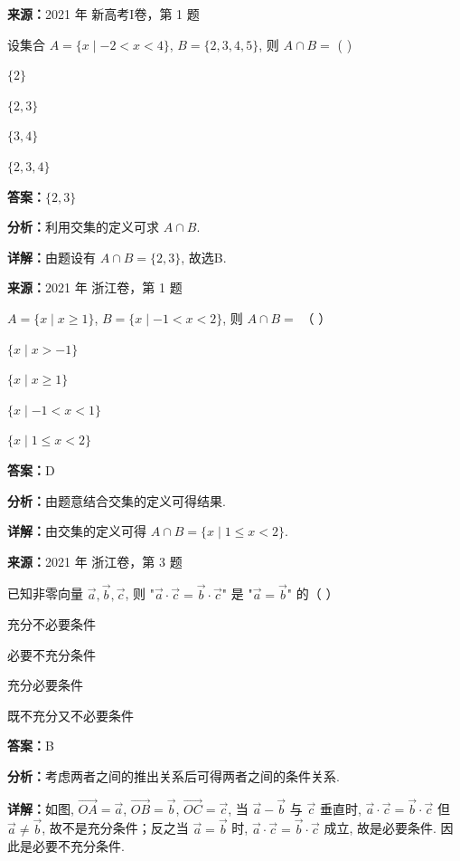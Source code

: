 \begin{question}[points=5]
\textbf{来源：}2021 年 新高考I卷，第 1 题\par
设集合 $A = \{x \mid -2 < x < 4\}$, $B = \{2,3,4,5\}$, 则 $A \cap B =$ ( )
\begin{choices}
  \item $\{2\}$
  \item $\{2,3\}$
  \item $\{3,4\}$
  \item $\{2,3,4\}$
\end{choices}
\begin{solution}
\textbf{答案：}$\{2,3\}$

\textbf{分析：}利用交集的定义可求 $A \cap B$.

\textbf{详解：}由题设有 $A \cap B = \{2,3\}$, 故选B.
\end{solution}
\end{question}

\begin{question}[points=4]
\textbf{来源：}2021 年 浙江卷，第 1 题\par
$A = \{x \mid x \geq 1\}$, $B = \{x \mid -1 < x < 2\}$, 则 $A \cap B =$ （   ）
\begin{choices}
  \item $\{x \mid x > -1\}$
  \item $\{x \mid x \geq 1\}$
  \item $\{x \mid -1 < x < 1\}$
  \item $\{x \mid 1 \leq x < 2\}$
\end{choices}
\begin{solution}
\textbf{答案：}D

\textbf{分析：}由题意结合交集的定义可得结果.

\textbf{详解：}由交集的定义可得 $A \cap B = \{x \mid 1 \leq x < 2\}$.
\end{solution}
\end{question}

\begin{question}[points=4]
\textbf{来源：}2021 年 浙江卷，第 3 题\par
已知非零向量 $\vec{a},\vec{b},\vec{c}$, 则 "$\vec{a}\cdot\vec{c}=\vec{b}\cdot\vec{c}$" 是 "$\vec{a}=\vec{b}$" 的（   ）
\begin{choices}
  \item 充分不必要条件
  \item 必要不充分条件
  \item 充分必要条件
  \item 既不充分又不必要条件
\end{choices}
\begin{solution}
\textbf{答案：}B

\textbf{分析：}考虑两者之间的推出关系后可得两者之间的条件关系.

\textbf{详解：}如图, $\overrightarrow{OA}=\vec{a}$, $\overrightarrow{OB}=\vec{b}$, $\overrightarrow{OC}=\vec{c}$, 当 $\vec{a}-\vec{b}$ 与 $\vec{c}$ 垂直时, $\vec{a}\cdot\vec{c}=\vec{b}\cdot\vec{c}$ 但 $\vec{a}\neq\vec{b}$, 故不是充分条件；反之当 $\vec{a}=\vec{b}$ 时, $\vec{a}\cdot\vec{c}=\vec{b}\cdot\vec{c}$ 成立, 故是必要条件. 因此是必要不充分条件.
\end{solution}
\end{question}

